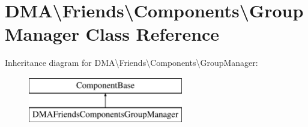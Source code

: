 \hypertarget{classDMA_1_1Friends_1_1Components_1_1GroupManager}{\section{D\+M\+A\textbackslash{}Friends\textbackslash{}Components\textbackslash{}Group\+Manager Class Reference}
\label{classDMA_1_1Friends_1_1Components_1_1GroupManager}
}
Inheritance diagram for D\+M\+A\textbackslash{}Friends\textbackslash{}Components\textbackslash{}Group\+Manager\+:\begin{figure}[H]
\begin{center}
\leavevmode
\includegraphics[height=2.000000cm]{d9/d20/classDMA_1_1Friends_1_1Components_1_1GroupManager}
\end{center}
\end{figure}
